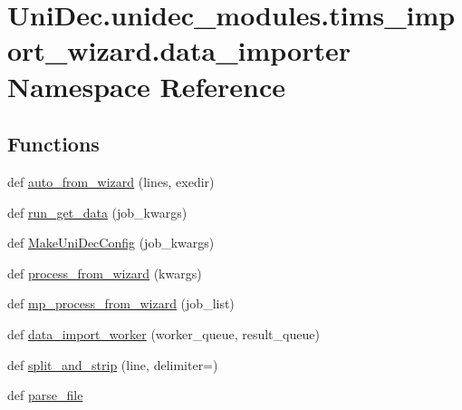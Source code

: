 \hypertarget{namespace_uni_dec_1_1unidec__modules_1_1tims__import__wizard_1_1data__importer}{}\section{Uni\+Dec.\+unidec\+\_\+modules.\+tims\+\_\+import\+\_\+wizard.\+data\+\_\+importer Namespace Reference}
\label{namespace_uni_dec_1_1unidec__modules_1_1tims__import__wizard_1_1data__importer}
\subsection*{Functions}
\begin{DoxyCompactItemize}
\item 
def \hyperlink{namespace_uni_dec_1_1unidec__modules_1_1tims__import__wizard_1_1data__importer_a671b9499cdd4171fd96a7818de0b140f}{auto\+\_\+from\+\_\+wizard} (lines, exedir)
\item 
def \hyperlink{namespace_uni_dec_1_1unidec__modules_1_1tims__import__wizard_1_1data__importer_a4e7722f0a03d7be059a801de76aeab25}{run\+\_\+get\+\_\+data} (job\+\_\+kwargs)
\item 
def \hyperlink{namespace_uni_dec_1_1unidec__modules_1_1tims__import__wizard_1_1data__importer_aefee170ad54f29851e2f7a217e5d9e31}{Make\+Uni\+Dec\+Config} (job\+\_\+kwargs)
\item 
def \hyperlink{namespace_uni_dec_1_1unidec__modules_1_1tims__import__wizard_1_1data__importer_aafb3cfd6fa59c2ea370175f68d9c4dc3}{process\+\_\+from\+\_\+wizard} (kwargs)
\item 
def \hyperlink{namespace_uni_dec_1_1unidec__modules_1_1tims__import__wizard_1_1data__importer_a2695b9bd34bd44c6d0f196397e1d56dc}{mp\+\_\+process\+\_\+from\+\_\+wizard} (job\+\_\+list)
\item 
def \hyperlink{namespace_uni_dec_1_1unidec__modules_1_1tims__import__wizard_1_1data__importer_ac7e71e68fee0bda236f0c2fb3f221c8f}{data\+\_\+import\+\_\+worker} (worker\+\_\+queue, result\+\_\+queue)
\item 
def \hyperlink{namespace_uni_dec_1_1unidec__modules_1_1tims__import__wizard_1_1data__importer_a3881a2196f34ab41d775c92863eaca23}{split\+\_\+and\+\_\+strip} (line, delimiter=\textquotesingle{})
\item 
def \hyperlink{namespace_uni_dec_1_1unidec__modules_1_1tims__import__wizard_1_1data__importer_a20777486f345a39f567150d99297ad32}{parse\+\_\+file}

\end{DoxyCompactItemize}
